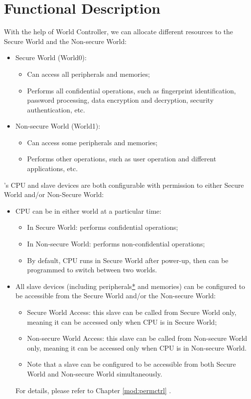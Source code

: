 \documentclass[main\_\_EN.tex]{subfiles}
\begin{document}
\section{Functional Description}
\label{sec:38-WCTRL-func-descr}

With the help of World Controller, we can allocate different resources to the Secure World and the Non-secure World:

\begin{itemize}
    \item Secure World (World0):
    \begin{itemize}
        \item Can access all peripherals and memories;
        \item Performs all confidential operations, such as fingerprint identification, password processing, data encryption and decryption, security authentication, etc.
    \end{itemize}
    \item Non-secure World (World1):
    \begin{itemize}
        \item Can access some peripherals and memories;
        \item Performs other operations, such as user operation and different applications, etc.
    \end{itemize}
\end{itemize}


\chipname{}'s CPU and slave devices are both configurable with permission to either Secure World and/or Non-Secure World:
\begin{itemize}
    \item CPU can be in either world at a particular time:
        \begin{itemize}
            \item In Secure World: performs confidential operations;
            \item In Non-secure World: performs non-confidential operations;
            \item By default, CPU runs in Secure World after power-up, then can be programmed to switch between two worlds.
        \end{itemize}
    \item All slave devices (including peripherals\hyperref[note:wctrl-access]{*} and memories) can be configured to be accessible from the Secure World and/or the Non-secure World:
        \begin{itemize}
            \item Secure World Access: this slave can be called from Secure World only, meaning it can be accessed only when CPU is in Secure World;
            \item Non-secure World Access: this slave can be called from Non-secure World only, meaning it can be accessed only when CPU is in Non-secure World.
            \item Note that a slave can be configured to be accessible from both Secure World and Non-secure World simultaneously.
        \end{itemize}
    For details, please refer to Chapter \ref{mod:permctrl} \textit{}.
\end{itemize}
\end{document}
